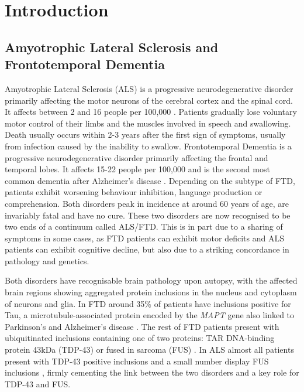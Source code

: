 
\chapter{Introduction}

\section{Amyotrophic Lateral Sclerosis and Frontotemporal Dementia} %

Amyotrophic Lateral Sclerosis (ALS) is a progressive neurodegenerative disorder primarily affecting the motor neurons of the cerebral cortex and the spinal cord. It affects between 2 and 16 people per 100,000 \citep{Logroscino2010}. Patients gradually lose voluntary motor control of their limbs and the muscles involved in speech and swallowing. Death usually occurs within 2-3 years after the first sign of symptoms, usually from infection caused by the inability to swallow. Frontotemporal Dementia is a progressive neurodegenerative disorder primarily affecting the frontal and temporal lobes. It affects 15-22 people per 100,000 and is the second most common dementia after Alzheimer's disease \citep{Onyike2013}. Depending on the subtype of FTD, patients exhibit worsening behaviour inhibition, language production or comprehension. Both disorders peak in incidence at around 60 years of age, are invariably fatal and have no cure. These two disorders are now recognised to be two ends of a continuum called ALS/FTD. This is in part due to a sharing of symptoms in some cases, as FTD patients can exhibit motor deficits and ALS patients can exhibit cognitive decline, but also due to a striking concordance in pathology and genetics.  %

Both disorders have recognisable brain pathology upon autopsy, with the affected brain regions showing aggregated protein inclusions in the nucleus and cytoplasm of neurons and glia. In FTD around 35\% of patients have inclusions positive for Tau, a microtubule-associated protein encoded by the \textit{MAPT} gene also linked to Parkinson's and Alzheimer's disease \citep{Rademakers2004}. The rest of FTD patients present with ubiquitinated inclusions containing one of two proteins: TAR DNA-binding protein 43kDa (TDP-43) \citep{Neumann2006, Arai2006} or fused in sarcoma (FUS) \citep{Neumann2009}. In ALS almost all patients present with TDP-43 positive inclusions \citep{Neumann2006, Arai2006} and a small number display FUS inclusions \citep{Vance2009-ye}, firmly cementing the link between the two disorders and a key role for TDP-43 and FUS.

